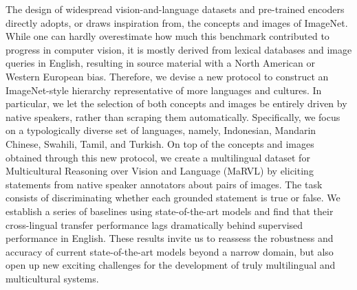 The design of widespread vision-and-language datasets and pre-trained encoders directly adopts, or draws inspiration from, the concepts and images of ImageNet. While one can hardly overestimate how much this benchmark contributed to progress in computer vision, it is mostly derived from lexical databases and image queries in English, resulting in source material with a North American or Western European bias. Therefore, we devise a new protocol to construct an ImageNet-style hierarchy representative of more languages and cultures. In particular, we let the selection of both concepts and images be entirely driven by native speakers, rather than scraping them automatically. Specifically, we focus on a typologically diverse set of languages, namely, Indonesian, Mandarin Chinese, Swahili, Tamil, and Turkish. On top of the concepts and images obtained through this new protocol, we create a multilingual dataset for Multicultural Reasoning over Vision and Language (MaRVL) by eliciting statements from native speaker annotators about pairs of images. The task consists of discriminating whether each grounded statement is true or false. We establish a series of baselines using state-of-the-art models and find that their cross-lingual transfer performance lags dramatically behind supervised performance in English. These results invite us to reassess the robustness and accuracy of current state-of-the-art models beyond a narrow domain, but also open up new exciting challenges for the development of truly multilingual and multicultural systems.
